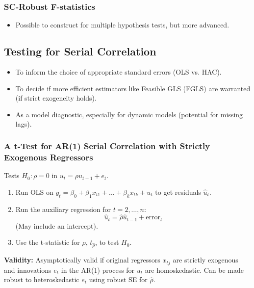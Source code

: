 \documentclass[a4paper, 10pt]{article}
\theoremstyle{definition}	%
\begin{document}
\subsubsection{SC-Robust F-statistics}
\begin{itemize}
    \item Possible to construct for multiple hypothesis tests, but more advanced.
\end{itemize}

\subsection{Testing for Serial Correlation}
\begin{itemize}
    \item To inform the choice of appropriate standard errors (OLS vs. HAC).
    \item To decide if more efficient estimators like Feasible GLS (FGLS) are warranted (if strict exogeneity holds).
    \item As a model diagnostic, especially for dynamic models (potential for missing lags).
\end{itemize}

\subsubsection{A t-Test for AR(1) Serial Correlation with Strictly Exogenous Regressors}
Tests \(H_0: \rho = 0\) in \(u_t = \rho u_{t-1} + e_t\).
\begin{enumerate}
    \item Run OLS on \(y_t = \beta_0 + \beta_1 x_{t1} + \dots + \beta_k x_{tk} + u_t\) to get residuals \(\hat{u}_t\).
    \item Run the auxiliary regression for \(t=2, \dots, n\):
    \begin{equation} \label{eq:aux_reg_ar1_strict}
    \hat{u}_t = \hat{\rho} \hat{u}_{t-1} + \text{error}_t
    \end{equation}
    (May include an intercept).
    \item Use the t-statistic for \(\hat{\rho}\), \(t_{\hat{\rho}}\), to test \(H_0\).
\end{enumerate}
\textbf{Validity:} Asymptotically valid if original regressors \(x_{tj}\) are strictly exogenous and innovations \(e_t\) in the AR(1) process for \(u_t\) are homoskedastic. Can be made robust to heteroskedastic \(e_t\) using robust SE for \(\hat{\rho}\).
\end{document}
